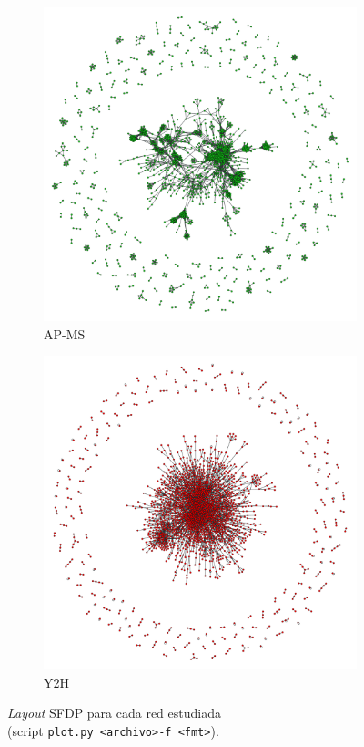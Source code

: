 \begin{figure}[!ht]
\begin{subfigure}[b]{0.30\columnwidth}
        \includegraphics[width=\textwidth]{./schemes/yeast_AP-MS-txt.pdf}
        \caption{\label{fig4:ap_ms} AP-MS}
    \end{subfigure}
    \begin{subfigure}[b]{0.30\columnwidth}
        \includegraphics[width=\textwidth]{./schemes/yeast_Y2H-txt.pdf}
        \caption{\label{fig4:y2h} Y2H}
    \end{subfigure}
    \caption{\label{fig4:grafos}\textit{Layout} SFDP para cada red estudiada \\
    (script \texttt{plot.py~<archivo>\quad-f <fmt>}).}
\end{figure}
